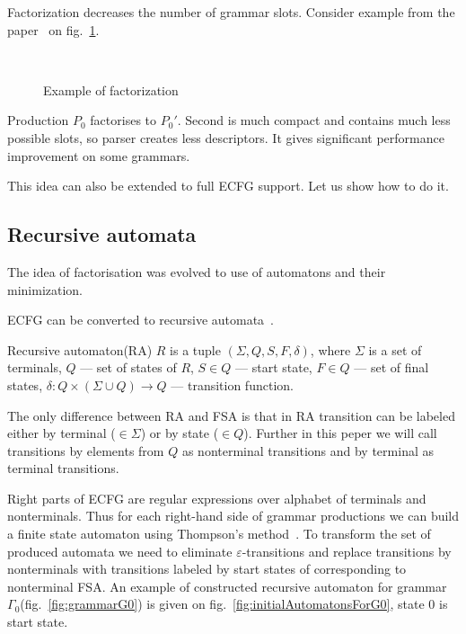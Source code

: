 \documentclass[runningheads,a4paper]{llncs}
\begin{document}
Factorization decreases the number of grammar slots. 
Consider example from the paper~\cite{scott2016structuring} on fig.~\ref{fig:ExampleOfFactorization}.

\begin{figure}
    \centering
    ~
    \caption{Example of factorization}
    \label{fig:ExampleOfFactorization}
\end{figure}
Production $P_0$ factorises to $P_0'$.
Second is much compact and contains much less possible slots, 
so parser creates less descriptors.
It gives significant performance improvement on some grammars.

This idea can also be extended to full ECFG support.
Let us show how to do it.

\subsection{Recursive automata}
The idea of factorisation was evolved to use of automatons and their minimization.

ECFG can be converted to recursive automata~\cite{tellier2006learning}.

\begin{mydef}
    Recursive automaton(RA) $R$ is a tuple $(\Sigma, Q, S, F, \delta)$, where
    $\Sigma$ is a set of terminals,
    $Q$ --- set of states of $R$,
    $S \in Q$ --- start state,
    $F \in Q$ --- set of final states,
    $\delta : Q \times (\Sigma \cup Q) \to Q$ --- transition function.
\end{mydef}

The only difference between RA and FSA is that in RA transition can be labeled either 
by terminal ($\in \Sigma$) or by state ($\in Q$). Further in this peper we will call
transitions by elements from $Q$ as nonterminal transitions and by terminal as terminal transitions.

Right parts of ECFG are regular expressions over alphabet of terminals and nonterminals.
Thus for each right-hand side of grammar productions we can build a finite state automaton 
using Thompson's method~\cite{Thompson:1968:PTR:363347.363387}. 
To transform the set of produced automata we need to eliminate $\varepsilon$-transitions and replace
transitions by nonterminals with transitions labeled by start states of corresponding to nonterminal FSA.
An example of constructed recursive automaton for grammar $\Gamma_{0}$(fig.~\ref{fig:grammarG0})
is given on fig.~\ref{fig:initialAutomatonsForG0}, state 0 is start state.
\end{document}

